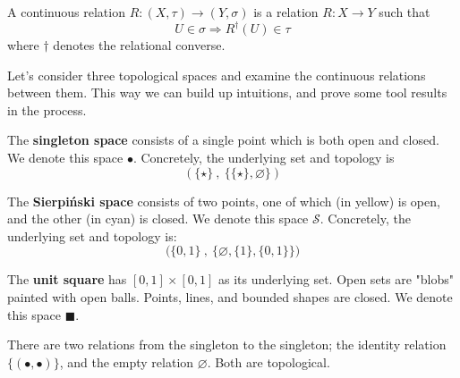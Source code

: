 

\begin{defn}\label{defn:Contrelation}
A continuous relation $R: (X,\tau) \rightarrow (Y,\sigma)$ is a relation $R: X \rightarrow Y$ such that \[U \in \sigma \Rightarrow R^{\dag}(U) \in \tau\] where $\dag$ denotes the relational converse.
\end{defn}

Let's consider three topological spaces and examine the continuous relations between them. This way we can build up intuitions, and prove some tool results in the process.

The \textbf{singleton space} consists of a single point which is both open and closed. We denote this space $\bullet$. Concretely, the underlying set and topology is
\[(\{\star\} \ , \ \{\{\star\},\varnothing\})\] 

The \textbf{Sierpi\'{n}ski space} consists of two points, one of which (in yellow) is open, and the other (in cyan) is closed. We denote this space $\mathcal{S}$. Concretely, the underlying set and topology is:
\[\big( \{0,1\} \ , \ \{ \varnothing, \{ 1 \} , \{ 0,1\} \} \big)\]

The \textbf{unit square} has $[0,1] \times [0,1]$ as its underlying set.  Open sets are "blobs" painted with open balls. Points, lines, and bounded shapes are closed. We denote this space $\blacksquare$.

\newthought{$\bullet \rightarrow \bullet$:} There are two relations from the singleton to the singleton; the identity relation $\{ (\bullet,\bullet) \}$, and the empty relation $\varnothing$. Both are topological.

